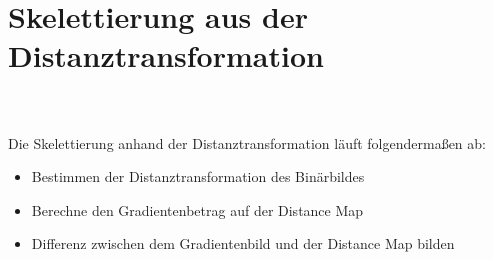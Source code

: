 \section{Skelettierung aus der Distanztransformation}
\\\\
Die Skelettierung anhand der Distanztransformation läuft folgendermaßen ab:
\begin{itemize}
\item Bestimmen der Distanztransformation des Binärbildes
\item Berechne den Gradientenbetrag auf der Distance Map
\item Differenz zwischen dem Gradientenbild und der Distance Map bilden
\end{itemize}